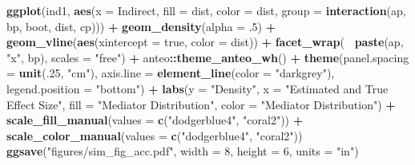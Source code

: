 \documentclass[]{DissertateUSU}
\newenvironment{Shaded}{\begin{snugshade}}{\end{snugshade}}
\newcommand{\KeywordTok}[1]{\textcolor[rgb]{0.13,0.29,0.53}{\textbf{#1}}}
\newcommand{\DataTypeTok}[1]{\textcolor[rgb]{0.13,0.29,0.53}{#1}}
\newcommand{\DecValTok}[1]{\textcolor[rgb]{0.00,0.00,0.81}{#1}}
\newcommand{\StringTok}[1]{\textcolor[rgb]{0.31,0.60,0.02}{#1}}
\newcommand{\OperatorTok}[1]{\textcolor[rgb]{0.81,0.36,0.00}{\textbf{#1}}}
\newcommand{\NormalTok}[1]{#1}
\begin{document}
\begin{Shaded}
\begin{Highlighting}[]
{{{{{{{\KeywordTok{ggplot}\NormalTok{(ind1, }\KeywordTok{aes}\NormalTok{(}\DataTypeTok{x =}\NormalTok{ Indirect, }\DataTypeTok{fill =}\NormalTok{ dist, }
                 \DataTypeTok{color =}\NormalTok{ dist, }
                 \DataTypeTok{group =} \KeywordTok{interaction}\NormalTok{(ap, bp, boot, dist, cp))) }\OperatorTok{+}
\StringTok{  }\KeywordTok{geom_density}\NormalTok{(}\DataTypeTok{alpha =}\NormalTok{ .}\DecValTok{5}\NormalTok{) }\OperatorTok{+}
\StringTok{  }\KeywordTok{geom_vline}\NormalTok{(}\KeywordTok{aes}\NormalTok{(}\DataTypeTok{xintercept =}\NormalTok{ true, }\DataTypeTok{color =}\NormalTok{ dist)) }\OperatorTok{+}
\StringTok{  }\KeywordTok{facet_wrap}\NormalTok{(}\OperatorTok{~}\StringTok{ }\KeywordTok{paste}\NormalTok{(ap, }\StringTok{"x"}\NormalTok{, bp), }\DataTypeTok{scales =} \StringTok{"free"}\NormalTok{) }\OperatorTok{+}
\StringTok{  }\NormalTok{anteo}\OperatorTok{::}\KeywordTok{theme_anteo_wh}\NormalTok{() }\OperatorTok{+}
\StringTok{  }\KeywordTok{theme}\NormalTok{(}\DataTypeTok{panel.spacing =} \KeywordTok{unit}\NormalTok{(.}\DecValTok{25}\NormalTok{, }\StringTok{"cm"}\NormalTok{),}
        \DataTypeTok{axis.line =} \KeywordTok{element_line}\NormalTok{(}\DataTypeTok{color =} \StringTok{"darkgrey"}\NormalTok{),}
        \DataTypeTok{legend.position =} \StringTok{"bottom"}\NormalTok{) }\OperatorTok{+}
\StringTok{  }\KeywordTok{labs}\NormalTok{(}\DataTypeTok{y =} \StringTok{"Density"}\NormalTok{,}
       \DataTypeTok{x =} \StringTok{"Estimated and True Effect Size"}\NormalTok{,}
       \DataTypeTok{fill =} \StringTok{"Mediator Distribution"}\NormalTok{,}
       \DataTypeTok{color =} \StringTok{"Mediator Distribution"}\NormalTok{) }\OperatorTok{+}
\StringTok{  }\KeywordTok{scale_fill_manual}\NormalTok{(}\DataTypeTok{values =} \KeywordTok{c}\NormalTok{(}\StringTok{"dodgerblue4"}\NormalTok{, }\StringTok{"coral2"}\NormalTok{)) }\OperatorTok{+}
\StringTok{  }\KeywordTok{scale_color_manual}\NormalTok{(}\DataTypeTok{values =} \KeywordTok{c}\NormalTok{(}\StringTok{"dodgerblue4"}\NormalTok{, }\StringTok{"coral2"}\NormalTok{))}
\KeywordTok{ggsave}\NormalTok{(}\StringTok{"figures/sim_fig_acc.pdf"}\NormalTok{, }
       \DataTypeTok{width =} \DecValTok{8}\NormalTok{, }\DataTypeTok{height =} \DecValTok{6}\NormalTok{, }\DataTypeTok{units =} \StringTok{"in"}\NormalTok{)}

}}}}}}}
\end{Highlighting}
\end{Shaded}
\end{document}
